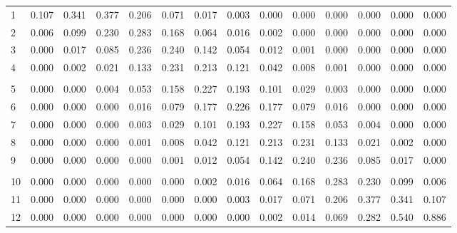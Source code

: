 \documentclass[
]{article}
\begin{document}
\begin{table}[H]
\begin{tabular}{lrrrrrrrrrrrrr}
\hspace{1em}1 & 0.107 & 0.341 & 0.377 & 0.206 & 0.071 & 0.017 & 0.003 & 0.000 & 0.000 & 0.000 & 0.000 & 0.000 & 0.000\\
\hspace{1em}2 & 0.006 & 0.099 & 0.230 & 0.283 & 0.168 & 0.064 & 0.016 & 0.002 & 0.000 & 0.000 & 0.000 & 0.000 & 0.000\\
\hspace{1em}3 & 0.000 & 0.017 & 0.085 & 0.236 & 0.240 & 0.142 & 0.054 & 0.012 & 0.001 & 0.000 & 0.000 & 0.000 & 0.000\\
\hspace{1em}4 & 0.000 & 0.002 & 0.021 & 0.133 & 0.231 & 0.213 & 0.121 & 0.042 & 0.008 & 0.001 & 0.000 & 0.000 & 0.000\\
\addlinespace[-.7em]
\multicolumn{14}{l}{ }\\
\hspace{1em}5 & 0.000 & 0.000 & 0.004 & 0.053 & 0.158 & 0.227 & 0.193 & 0.101 & 0.029 & 0.003 & 0.000 & 0.000 & 0.000\\
\hspace{1em}6 & 0.000 & 0.000 & 0.000 & 0.016 & 0.079 & 0.177 & 0.226 & 0.177 & 0.079 & 0.016 & 0.000 & 0.000 & 0.000\\
\hspace{1em}7 & 0.000 & 0.000 & 0.000 & 0.003 & 0.029 & 0.101 & 0.193 & 0.227 & 0.158 & 0.053 & 0.004 & 0.000 & 0.000\\
\hspace{1em}8 & 0.000 & 0.000 & 0.000 & 0.001 & 0.008 & 0.042 & 0.121 & 0.213 & 0.231 & 0.133 & 0.021 & 0.002 & 0.000\\
\hspace{1em}9 & 0.000 & 0.000 & 0.000 & 0.000 & 0.001 & 0.012 & 0.054 & 0.142 & 0.240 & 0.236 & 0.085 & 0.017 & 0.000\\
\addlinespace[-.7em]
\multicolumn{14}{l}{ }\\
\hspace{1em}10 & 0.000 & 0.000 & 0.000 & 0.000 & 0.000 & 0.002 & 0.016 & 0.064 & 0.168 & 0.283 & 0.230 & 0.099 & 0.006\\
\hspace{1em}11 & 0.000 & 0.000 & 0.000 & 0.000 & 0.000 & 0.000 & 0.003 & 0.017 & 0.071 & 0.206 & 0.377 & 0.341 & 0.107\\
\hspace{1em}12 & 0.000 & 0.000 & 0.000 & 0.000 & 0.000 & 0.000 & 0.000 & 0.002 & 0.014 & 0.069 & 0.282 & 0.540 & 0.886\\
\bottomrule
\end{tabular}
\end{table}
\end{document}
